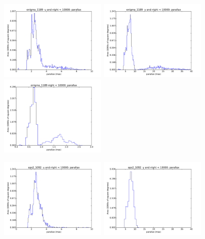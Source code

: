 \begin{figure}[ht]
  \begin{center}
  \includegraphics[width=2.0in]{./figs/milkyway/MW_Astrom_paError_1189_u_hst.pdf}
  \includegraphics[width=2.0in]{./figs/milkyway/MW_Astrom_paError_1189_y_hst.pdf}
  \includegraphics[width=2.0in]{./figs/milkyway/MW_Astrom_paError_1189_10y_hst.pdf}
  \end{center}
  \begin{center}
  \includegraphics[width=2.0in]{./figs/milkyway/MW_Astrom_paError_1092_u_hst.pdf}
  \includegraphics[width=2.0in]{./figs/milkyway/MW_Astrom_paError_1092_y_hst.pdf}

\end{center}
\end{figure}
